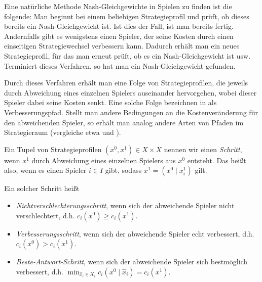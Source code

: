 Eine natürliche Methode Nash-Gleichgewichte in Spielen zu finden ist die folgende: Man beginnt bei einem beliebigen Strategieprofil und prüft, ob dieses bereits ein Nash-Gleichgewicht ist. Ist dies der Fall, ist man bereits fertig. Andernfalls gibt es wenigstens einen Spieler, der seine Kosten durch einen einseitigen Strategiewechsel verbessern kann. Dadurch erhält man ein neues Strategieprofil, für das man erneut prüft, ob es ein Nash-Gleichgewicht ist usw. Terminiert dieses Verfahren, so hat man ein Nash-Gleichgewicht gefunden. 

Durch dieses Verfahren erhält man eine Folge von Strategieprofilen, die jeweils durch Abweichung eines einzelnen Spielers auseinander hervorgehen, wobei dieser Spieler dabei seine Kosten senkt. Eine solche Folge bezeichnen \citeauthor{MonShap} in \cite{MonShap} als \glqq Verbesserungspfad\grqq. Stellt man andere Bedingungen an die Kostenveränderung für den abweichenden Spieler, so erhält man analog andere Arten von Pfaden im Strategieraum (vergleiche etwa \cite{CharExOrdPot} und \cite{BestRespPot}).

\begin{defn}\label{defn:Schritte}
	Ein Tupel von Strategieprofilen $(x^0, x^1) \in X\times X$ nennen wir einen \emph{Schritt}, wenn $x^1$ durch Abweichung eines einzelnen Spielers aus $x^0$ entsteht. Das heißt also, wenn es einen Spieler $i \in I$ gibt, sodass $x^1 = (x^0 \mid x^1_i)$ gilt. 
	
	Ein solcher Schritt heißt
	\begin{itemize}
		\item \emph{Nichtverschlechterungsschritt}, wenn sich der abweichende Spieler nicht verschlechtert, d.h. $c_i(x^0) \geq c_i(x^1)$.
		\item \emph{Verbesserungsschritt}, wenn sich der abweichende Spieler echt verbessert, d.h. $c_i(x^0) > c_i(x^1)$.
		\item \emph{Beste-Antwort-Schritt}, wenn sich der abweichende Spieler sich bestmöglich verbessert, d.h. $\min_{\hat{x}_i \in X_i} c_i(x^0 \mid \hat{x}_i) = c_i(x^1)$.		
	\end{itemize}
\end{defn}


